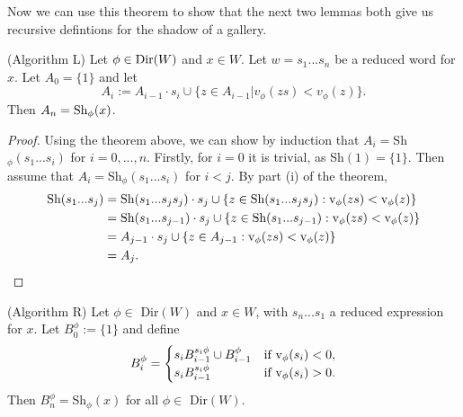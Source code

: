 \documentclass[11pt]{article}
\begin{document}
Now we can use this theorem to show that the next two lemmas both give us recursive defintions for the shadow of a gallery. 

\begin{lemma} (Algorithm L)
    Let $\phi\in\textnormal{Dir}(W)$ and $x\in W$. Let $w=s_1...s_n$ be a reduced word for $x$. Let $A_0=\{1\}$ and let
    \[A_i:=A_{i-1}\cdot s_i\cup \{z\in A_{i-1}|v_\phi(zs)<v_\phi(z)\}.\]
    Then $A_n=\textnormal{Sh}_\phi(x)$. 
\end{lemma}

\begin{proof}
    Using the theorem above, we can show by induction that $A_i=$Sh$_\phi(s_1...s_i)$ for $i=0,...,n$. Firstly, for $i=0$ it is trivial, as Sh$(1)=\{1\}$. Then assume that $A_i=$Sh$_\phi(s_1...s_i)$ for $i<j$. By part (i) of the theorem,\[\begin{aligned}
    \textnormal{Sh}(s_1...s_j)& = \textnormal{Sh}(s_1...s_js_j)\cdot s_j \cup \{z\in \textnormal{Sh}(s_1...s_js_j): \textnormal{v}_\phi(zs)<\textnormal{v}_\phi(z)\}\\
        & = \textnormal{Sh}(s_1...s_{j-1})\cdot s_j \cup \{z\in \textnormal{Sh}(s_1...s_{j-1}): \textnormal{v}_\phi(zs)<\textnormal{v}_\phi(z)\}\\
        & = A_{j-1}\cdot s_j \cup \{z\in A_{j-1}: \textnormal{v}_\phi(zs)<\textnormal{v}_\phi(z)\}\\
        & = A_j.
    \end{aligned}\]
\end{proof}

\begin{lemma} (Algorithm R)
    Let $\phi\in$ Dir$(W)$ and $x\in W$, with $s_n...s_1$ a reduced expression for $x$. Let $B_0^\phi:=\{1\}$ and define
    \[B_i^\phi = \begin{cases}
        s_iB_{i-1}^{s_i\phi}\cup B_{i-1}^\phi & \textnormal{if v}_\phi(s_i)<0,\\
        s_iB_{i-1}^{s_i\phi} & \textnormal{if v}_\phi(s_i)>0.
    \end{cases}\]
    Then $B^\phi_n=$Sh$_\phi(x)$ for all $\phi\in$ Dir$(W)$. 
\end{lemma}
\end{document}
